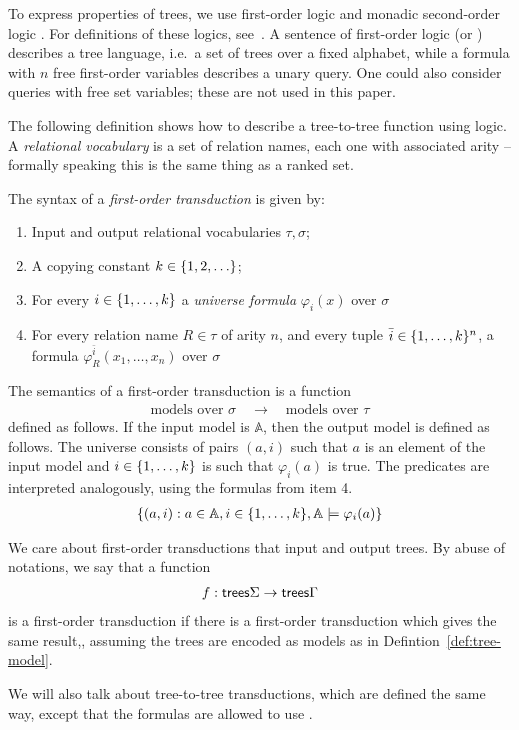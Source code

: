  To express properties of trees, we use first-order logic and monadic second-order logic \mso. For definitions of these logics, see~\cite[Section 3]{thomas1997languages}.
 A sentence of first-order logic (or \mso) describes a tree language, i.e.~a set of trees over a fixed alphabet, while a formula with $n$ free first-order variables describes a unary query.  One could also consider queries with free set variables; these are not used in this paper.

The following definition shows how to describe  a tree-to-tree function using logic. A \emph{relational vocabulary} is a set of relation names, each one with associated arity -- formally speaking this is the same thing as a ranked set. 

\begin{definition}\label{def:fo-transduction}
    The syntax of a \emph{first-order transduction}  is given by:
\begin{enumerate}
    \item Input and output relational vocabularies $\tau,\sigma$;
    \item A copying constant $k \in \{1,2,\ldots\}$;
    \item For every $i \in \{1,\ldots,k\}$ a \emph{universe formula} $\varphi_i(x)$ over $\sigma$
    \item For every relation name $R \in \tau$ of arity $n$, and every tuple $\bar i \in \{1,\ldots,k\}^n$, a formula $\varphi_R^{\bar i}(x_1,\ldots,x_n)$ over $\sigma$
\end{enumerate}
\end{definition}

The semantics of a first-order transduction is  a function
\begin{align*}
    \text{models over $\sigma$} \quad \to \quad \text{models over $\tau$}
\end{align*}
defined as follows. If the input model is $\mathbb A$, then the output model is defined as follows. The universe consists of pairs $(a,i)$ such that $a$ is an element of the input model and $i \in \{1,\ldots,k\}$ is such that $\varphi_i(a)$ is true. The predicates are interpreted analogously, using the formulas from item 4. 
\begin{align*}
    \{(a,i) : a \in \mathbb A, i \in \{1,\ldots,k\} , \mathbb A \models \varphi_i(a)\}
\end{align*}

We care about first-order transductions that input and output trees. By abuse of notations, we say that a  function 
    \begin{align*}
        f : \mathsf {trees} \Sigma \to \mathsf {trees} \Gamma
    \end{align*}
    is  a first-order transduction if there is a first-order transduction which gives the same result,, assuming the trees are encoded as models as in Defintion~\ref{def:tree-model}.   

    We will also talk about \mso tree-to-tree transductions, which are defined the same way, except that the formulas are allowed to use \mso. 

